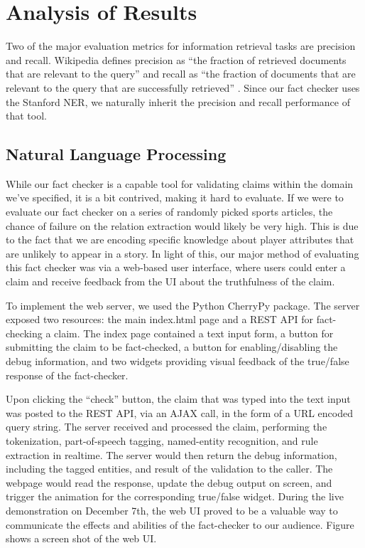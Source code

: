 \documentclass{chi2009}
\begin{document}
\section{Analysis of Results}

Two of the major evaluation metrics for information retrieval tasks are precision and recall.  Wikipedia defines precision as ``the fraction of retrieved documents that are relevant to the query'' \cite{precision} and recall as ``the fraction of documents that are relevant to the query that are successfully retrieved'' \cite{precision}.  Since our fact checker uses the Stanford NER, we naturally inherit the precision and recall performance of that tool.  
\subsection{Natural Language Processing}

While our fact checker is a capable tool for validating claims within the domain we've specified, it is a bit contrived, making it hard to evaluate.  If we were to evaluate our fact checker on a series of randomly picked sports articles, the chance of failure on the relation extraction would likely be very high.  This is due to the fact that we are encoding specific knowledge about player attributes that are unlikely to appear in a story.  In light of this, our major method of evaluating this fact checker was via a web-based user interface, where users could enter a claim and receive feedback from the UI about the truthfulness of the claim.  

To implement the web server, we used the Python CherryPy package.  The server exposed two resources: the main index.html page and a REST API for fact-checking a claim.  The index page contained a text input form, a button for submitting the claim to be fact-checked, a button for enabling/disabling the debug information, and two widgets providing visual feedback of the true/false response of the fact-checker.  

Upon clicking the ``check'' button, the claim that was typed into the text input was posted to the REST API, via an AJAX call, in the form of a URL encoded query string.  The server received and processed the claim, performing the tokenization, part-of-speech tagging, named-entity recognition, and rule extraction in realtime.  The server would then return the debug information, including the tagged entities, and result of the validation to the caller.  The webpage would read the response, update the debug output on screen, and trigger the animation for the corresponding true/false widget.  During the live demonstration on December 7th, the web UI proved to be a valuable way to communicate the effects and abilities of the fact-checker to our audience. Figure \cite{imgWeb} shows a screen shot of the web UI. 
\end{document}
